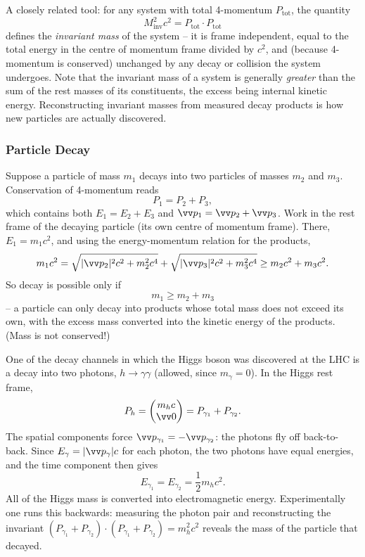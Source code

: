 \begin{remark}
	A closely related tool: for any system with total 4-momentum $P_{\text{tot}}$, the quantity
	$$
	M_{\text{inv}}^2 c^2 = P_{\text{tot}} \cdot P_{\text{tot}}
	$$
	defines the \emph{invariant mass} of the system -- it is frame independent, equal to the total energy in the centre of momentum frame divided by $c^2$, and (because 4-momentum is conserved) unchanged by any decay or collision the system undergoes. Note that the invariant mass of a system is generally \emph{greater} than the sum of the rest masses of its constituents, the excess being internal kinetic energy. Reconstructing invariant masses from measured decay products is how new particles are actually discovered.
\end{remark}

\subsubsection{Particle Decay}

Suppose a particle of mass $m_1$ decays into two particles of masses $m_2$ and $m_3$. Conservation of 4-momentum reads
$$
P_1 = P_2 + P_3,
$$
which contains both $E_1 = E_2 + E_3$ and $\vv p_1 = \vv p_2 + \vv p_3$. Work in the rest frame of the decaying particle (its own centre of momentum frame). There, $E_1 = m_1 c^2$, and using the energy-momentum relation for the products,
$$
m_1 c^2 = \sqrt{|\vv p_2|^2 c^2 + m_2^2 c^4} + \sqrt{|\vv p_3|^2 c^2 + m_3^2 c^4} \geq m_2 c^2 + m_3 c^2.
$$
So decay is possible only if
$$
m_1 \geq m_2 + m_3
$$
-- a particle can only decay into products whose total mass does not exceed its own, with the excess mass converted into the kinetic energy of the products. (Mass is not conserved!)

\begin{example}
	One of the decay channels in which the Higgs boson was discovered at the LHC is a decay into two photons, $h \to \gamma\gamma$ (allowed, since $m_\gamma = 0$). In the Higgs rest frame,
	$$
	P_h = \begin{pmatrix} m_h c \\ \vv 0 \end{pmatrix} = P_{\gamma_1} + P_{\gamma_2}.
	$$
	The spatial components force $\vv p_{\gamma_1} = -\vv p_{\gamma_2}$: the photons fly off back-to-back. Since $E_\gamma = |\vv p_\gamma| c$ for each photon, the two photons have equal energies, and the time component then gives
	$$
	E_{\gamma_1} = E_{\gamma_2} = \frac{1}{2}m_h c^2.
	$$
	All of the Higgs mass is converted into electromagnetic energy. Experimentally one runs this backwards: measuring the photon pair and reconstructing the invariant $(P_{\gamma_1} + P_{\gamma_2})\cdot(P_{\gamma_1} + P_{\gamma_2}) = m_h^2c^2$ reveals the mass of the particle that decayed.
\end{example}

